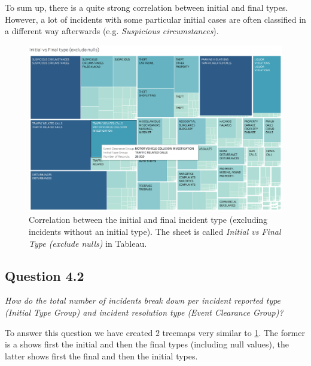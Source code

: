 To sum up, there is a quite strong correlation between initial and final types.
However, a lot of incidents with some particular initial cases are often classified in a different way afterwards (e.g. \textit{Suspicious circumstances}).

\begin{figure}[h]
	\centering
	\includegraphics[width=\columnwidth]{figures/4_1_initial_vs_final_group_treemap}
	\caption{Correlation between the initial and final incident type (excluding incidents without an initial type). The sheet is called \textit{Initial vs Final Type (exclude nulls)} in Tableau.}
	\label{fig:4_1_initial_vs_final_group_treemap}
\end{figure}


\subsection*{Question 4.2}
\textit{How do the total number of incidents break down per incident reported type (Initial Type Group) and incident resolution type (Event Clearance Group)?}

To answer this question we have created $2$ treemaps very similar to \cref{fig:4_1_initial_vs_final_group_treemap}.
The former is a shows first the initial and then the final types (including null values), the latter shows first the final and then the initial types.


